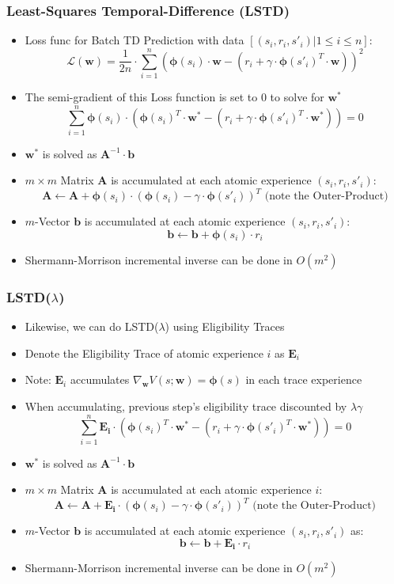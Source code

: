 \documentclass[handout]{beamer}
\begin{document}
\begin{frame}
\frametitle{Least-Squares Temporal-Difference (LSTD)}
\pause
\begin{itemize}[<+->]
\item Loss func for Batch TD Prediction with data $[(s_i, r_i, s'_i) | 1 \leq i \leq n]$:
$$\mathcal{L}(\bm{w}) = \frac 1 {2n} \cdot \sum_{i=1}^n (\bm{\phi}(s_i) \cdot \bm{w} - (r_i + \gamma \cdot \bm{\phi}(s'_i)^T \cdot \bm{w}))^2$$
\item The semi-gradient of this Loss function is set to 0 to solve for $\bm{w}^*$
$$\sum_{i=1}^n \bm{\phi}(s_i) \cdot (\bm{\phi}(s_i)^T \cdot \bm{w^*} - (r_i + \gamma \cdot \bm{\phi}(s'_i)^T \cdot \bm{w}^*)) = 0$$
\item $\bm{w}^*$ is solved as $\bm{A}^{-1} \cdot \bm{b}$
\item $m \times m$ Matrix $\bm{A}$ is accumulated at each atomic experience $(s_i, r_i, s'_i)$:
$$ \bm{A} \leftarrow \bm{A} + \bm{\phi}(s_i) \cdot (\bm{\phi}(s_i) - \gamma \cdot \bm{\phi}(s'_i))^T \text{ (note the Outer-Product)}$$
\item $m$-Vector $\bm{b}$ is accumulated at each atomic experience $(s_i, r_i, s'_i)$:
$$\bm{b} \leftarrow \bm{b} + \bm{\phi}(s_i) \cdot r_i$$
\item Shermann-Morrison incremental inverse can be done in $O(m^2)$
\end{itemize}
\end{frame}

\begin{frame}
\frametitle{LSTD($\lambda$)}
\pause
\begin{itemize}[<+->]
\item Likewise, we can do LSTD($\lambda$) using Eligibility Traces
\item Denote the Eligibility Trace of atomic experience $i$ as $\bm{E}_i$
\item Note: $\bm{E}_i$ accumulates $\nabla_{\bm{w}} V(s;\bm{w}) = \bm{\phi}(s)$ in each trace experience
\item When accumulating, previous step's eligibility trace discounted by $\lambda \gamma$
$$\sum_{i=1}^n \bm{E_i} \cdot (\bm{\phi}(s_i)^T \cdot \bm{w^*} - (r_i + \gamma \cdot \bm{\phi}(s'_i)^T \cdot \bm{w}^*)) = 0$$
\item $\bm{w}^*$ is solved as $\bm{A}^{-1} \cdot \bm{b}$
\item $m \times m$ Matrix $\bm{A}$ is accumulated at each atomic experience $i$:
$$ \bm{A} \leftarrow \bm{A} + \bm{E_i} \cdot (\bm{\phi}(s_i) - \gamma \cdot \bm{\phi}(s'_i))^T \text{ (note the Outer-Product)}$$
\item $m$-Vector $\bm{b}$ is accumulated at each atomic experience $(s_i, r_i, s'_i)$ as:
$$\bm{b} \leftarrow \bm{b} + \bm{E_i} \cdot r_i$$
\item Shermann-Morrison incremental inverse can be done in $O(m^2)$
\end{itemize}
\end{frame}
\end{document}
